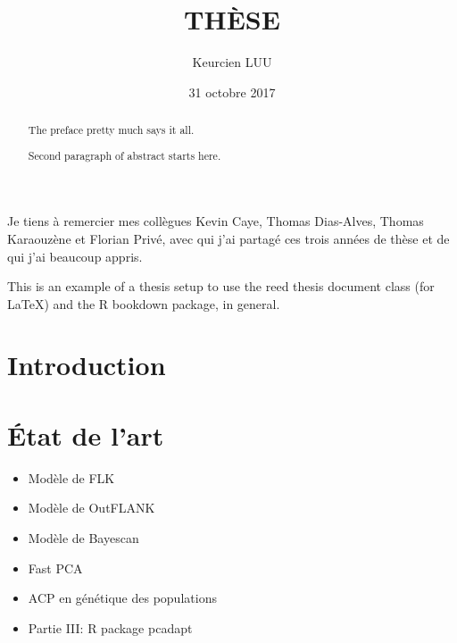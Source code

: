 \documentclass[12pt,twoside]{reedthesis}
\title{THÈSE}
\author{Keurcien LUU}
\date{31 octobre 2017}
\theoremstyle{definition}
\theoremstyle{definition}
\theoremstyle{remark}
\begin{document}
      \maketitle
  
  \frontmatter %
  \pagestyle{empty} %

      \begin{acknowledgements}
      Je tiens à remercier mes collègues Kevin Caye, Thomas Dias-Alves, Thomas
      Karaouzène et Florian Privé, avec qui j'ai partagé ces trois années de
      thèse et de qui j'ai beaucoup appris.
    \end{acknowledgements}
  
      \begin{preface}
      This is an example of a thesis setup to use the reed thesis document
      class (for LaTeX) and the R bookdown package, in general.
    \end{preface}
  
      \hypersetup{linkcolor=black}
    \setcounter{tocdepth}{2}
    \tableofcontents
  
      \listoftables
  
      \listoffigures
  
      \begin{abstract}
      The preface pretty much says it all. \par  Second paragraph of abstract
      starts here.
    \end{abstract}
  
  
  \mainmatter %
  \pagestyle{fancyplain} %

  \chapter*{Introduction}\label{introduction}
  
  \chapter{État de l'art}\label{etat-de-lart}
  
  \begin{itemize}
  \item
    Modèle de FLK
  \item
    Modèle de OutFLANK
  \item
    Modèle de Bayescan
  \item
    Fast PCA
  \item
    ACP en génétique des populations
  \item
    Partie III: R package pcadapt
  \end{itemize}
  
\end{document}

